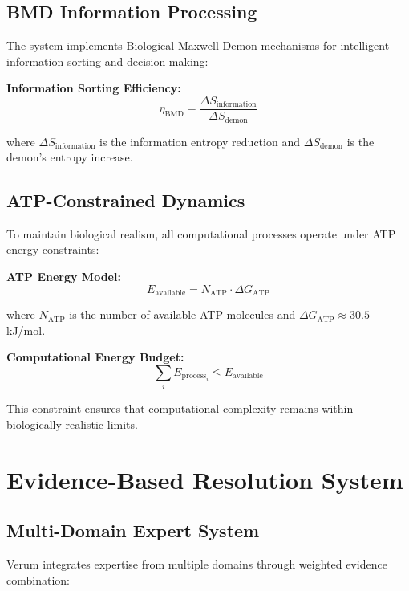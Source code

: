\documentclass[11pt,a4paper]{article}
\begin{document}
\subsection{BMD Information Processing}

The system implements Biological Maxwell Demon mechanisms for intelligent information sorting and decision making:

\textbf{Information Sorting Efficiency:}
\begin{equation}
\eta_{\text{BMD}} = \frac{\Delta S_{\text{information}}}{\Delta S_{\text{demon}}}
\end{equation}

where $\Delta S_{\text{information}}$ is the information entropy reduction and $\Delta S_{\text{demon}}$ is the demon's entropy increase.

\subsection{ATP-Constrained Dynamics}

To maintain biological realism, all computational processes operate under ATP energy constraints:

\textbf{ATP Energy Model:}
\begin{equation}
E_{\text{available}} = N_{\text{ATP}} \cdot \Delta G_{\text{ATP}}
\end{equation}

where $N_{\text{ATP}}$ is the number of available ATP molecules and $\Delta G_{\text{ATP}} \approx 30.5$ kJ/mol.

\textbf{Computational Energy Budget:}
\begin{equation}
\sum_{i} E_{\text{process}_i} \leq E_{\text{available}}
\end{equation}

This constraint ensures that computational complexity remains within biologically realistic limits.

\section{Evidence-Based Resolution System}

\subsection{Multi-Domain Expert System}

Verum integrates expertise from multiple domains through weighted evidence combination:
\end{document}
